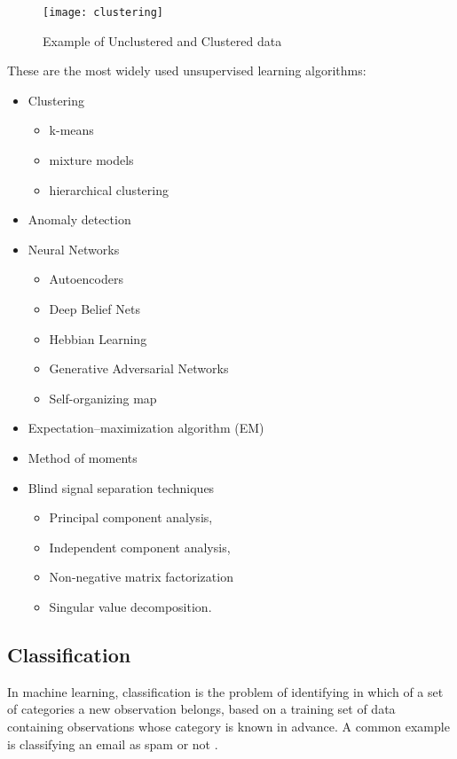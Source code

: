 \begin{figure}[H]
	\centering
	\texttt{[image: clustering]}
	\caption{Example of Unclustered and Clustered data \cite{kmeans}}
	\label{fig:clustering}
\end{figure}	

These are the most widely used unsupervised learning algorithms:

\begin{itemize}[noitemsep]
	\item Clustering
	\begin{itemize}[noitemsep]
		\item k-means
		\item mixture models
		\item hierarchical clustering
	\end{itemize}
	\item Anomaly detection
	\item Neural Networks
	\begin{itemize}[noitemsep]
		\item Autoencoders
		\item Deep Belief Nets
		\item Hebbian Learning
		\item Generative Adversarial Networks
		\item Self-organizing map
	\end{itemize}
	\item Expectation–maximization algorithm (EM)
	\item Method of moments
	\item Blind signal separation techniques
	\begin{itemize}[noitemsep]
		\item Principal component analysis,
		\item Independent component analysis,
		\item Non-negative matrix factorization
		\item Singular value decomposition.
	\end{itemize}
\end{itemize}

\subsection{Classification} \label{classification}
In machine learning, classification is the problem of identifying in which of a set of categories a new observation belongs, based on a training set of data containing observations whose category is known in advance. A common example is classifying an email as spam or not \cite{wiki:classification}.


